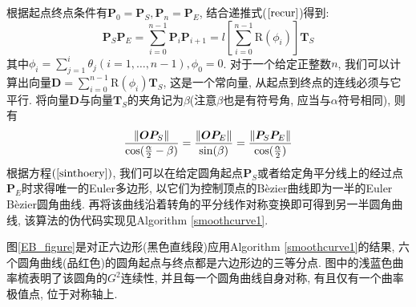 \documentclass[utf8]{ctexart} %
\begin{document}
		根据起点终点条件有$\boldsymbol{P}_0=\boldsymbol{P}_S, \boldsymbol{P}_n = \boldsymbol{P}_E$, 结合递推式($\ref{recur}$)得到:
		\begin{equation}
			\boldsymbol{P}_S\boldsymbol{P}_E = \sum_{i=0}^{n-1}\boldsymbol{P}_i\boldsymbol{P}_{i+1} = l[\sum_{i=0}^{n-1}\text{R}(\phi_i)]\boldsymbol{T}_S
		\end{equation}
		其中$\phi_i=\sum_{j=1}^i\theta_j (i = 1,\dots,n-1), \phi_0 = 0$. 对于一个给定正整数$n$, 我们可以计算出向量$\boldsymbol{D} = \sum_{i=0}^{n-1}\text{R}(\phi_i)\boldsymbol{T}_S$, 这是一个常向量, 从起点到终点的连线必须与它平行. 将向量$\boldsymbol{D}$与向量$\boldsymbol{T}_S$的夹角记为$\beta$(注意$\beta$也是有符号角, 应当与$\alpha$符号相同), 则有
		\begin{equation}\label{sinthoery}
			\frac{\Arrowvert\boldsymbol{OP}_S\Arrowvert}{\cos(\frac{\alpha}2-\beta)}=\frac{\Arrowvert\boldsymbol{OP}_E\Arrowvert}{\sin(\beta)}=\frac{\Arrowvert\boldsymbol{P}_S\boldsymbol{P}_E\Arrowvert}{\cos(\frac{\alpha}2)}
		\end{equation}
		根据方程$(\ref{sinthoery})$, 我们可以在给定圆角起点$\boldsymbol{P}_S$或者给定角平分线上的经过点$\boldsymbol{P}_E$时求得唯一的Euler多边形, 以它们为控制顶点的B\`{e}zier曲线即为一半的Euler B\`{e}zier圆角曲线. 再将该曲线沿着转角的平分线作对称变换即可得到另一半圆角曲线, 该算法的伪代码实现见Algorithm \ref{smoothcurve1}.\par 
		图\ref{EB_figure}是对正六边形(黑色直线段)应用Algorithm \ref{smoothcurve1}的结果, 六个圆角曲线(品红色)的圆角起点与终点都是六边形边的三等分点. 图中的浅蓝色曲率梳表明了该圆角的$G^2$连续性, 并且每一个圆角曲线自身对称, 有且仅有一个曲率极值点, 位于对称轴上.
		\IncMargin{1em}
\end{document}
